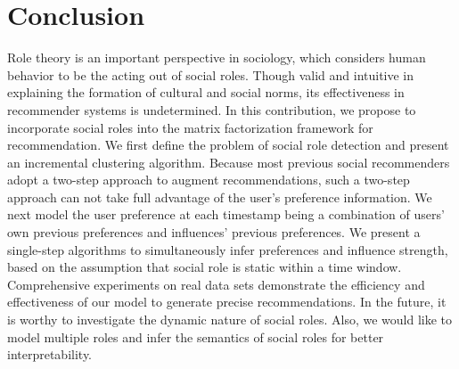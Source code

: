 \documentclass{ieeeaccess}
\begin{document}
\section{Conclusion}\label{sec:conclusion}
Role theory is an important perspective in sociology, which considers human behavior to be the acting out of social roles. Though valid and intuitive in explaining the formation of cultural and social norms, its effectiveness in recommender systems is undetermined.  In this contribution, we propose to incorporate social roles into the matrix factorization framework for recommendation. We first define the problem of  social role detection and present an incremental clustering algorithm. Because most previous social recommenders adopt a two-step approach to augment recommendations, such a two-step approach can not take full advantage of the user's preference information. We next model the user preference at each timestamp being a combination of users' own previous preferences and influences' previous preferences. We present a single-step algorithms to simultaneously infer preferences and influence strength, based on the assumption that social role is static within a time window. Comprehensive experiments on real data sets demonstrate the efficiency and effectiveness of our model to generate precise recommendations. In the future, it is worthy to investigate the dynamic nature of social roles.  Also, we would like to model multiple roles and infer the semantics of social roles for better interpretability.
\end{document}
